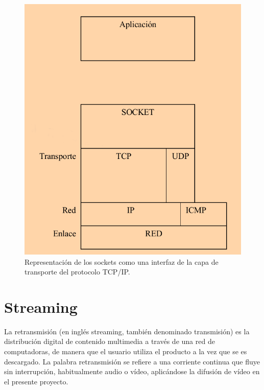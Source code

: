 \begin{figure}[H]
  \begin{center}
    \includegraphics[scale=0.5]{imagenes/modelo-tcp-ip-socket.png}
  \end{center}
  \caption{ Representación de los sockets como una interfaz de la capa de transporte del protocolo TCP/IP.}
  \label{diagram:socket}
\end{figure}


\section{Streaming}
\label{sec:def-streaming}

La retransmisión (en inglés streaming, también denominado transmisión) es la distribución digital de contenido multimedia a través de una red de computadoras, 
de manera que el usuario utiliza el producto a la vez que se es descargado. La palabra retransmisión se refiere a una corriente continua que fluye sin interrupción, habitualmente audio o vídeo, aplicándose la difusión 
de vídeo en el presente proyecto. \\


